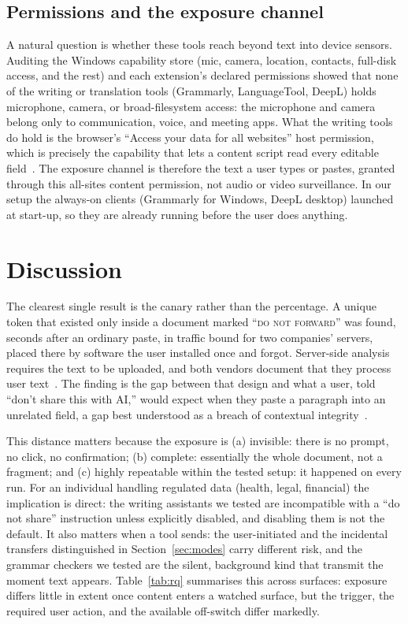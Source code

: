 \documentclass[sigconf,anonymous,review,balance=false]{acmart}
\begin{document}
\subsection{Permissions and the exposure channel}
\label{sec:permissions}

A natural question is whether these tools reach beyond text into device sensors. Auditing
the Windows capability store (mic, camera, location, contacts, full-disk access, and the
rest) and each extension's declared permissions showed that none of the writing or
translation tools (Grammarly, LanguageTool, DeepL) holds microphone, camera, or
broad-filesystem access: the microphone and camera belong only to communication, voice,
and meeting apps. What the writing tools do hold is the browser's ``Access your data for all
websites'' host permission, which is precisely the capability
that lets a content script read every editable field~\citep{mozilla2024permissions}. The
exposure channel is therefore the text a user types or pastes, granted through this
all-sites content permission, not audio or video surveillance. In our setup the always-on
clients (Grammarly for Windows, DeepL desktop) launched at start-up, so they are already
running before the user does anything.

\section{Discussion}
\label{sec:discussion}

The clearest single result is the canary rather than the percentage. A unique
token that existed only inside a document marked ``\textsc{do not forward}'' was found,
seconds after an ordinary paste, in traffic bound for two companies' servers, placed
there by software the user installed once and forgot. Server-side analysis requires the
text to be uploaded, and both vendors
document that they process user text~\citep{grammarly2025privacy,languagetool2025privacy}.
The finding is the gap between that design and what a user, told ``don't share this with
AI,'' would expect when they paste a paragraph into an unrelated field, a gap best
understood as a breach of contextual integrity~\citep{nissenbaum2004contextual}.

This distance matters because the exposure is (a) invisible: there is no prompt, no
click, no confirmation; (b) complete: essentially the whole document, not a
fragment; and (c) highly repeatable within the tested setup: it happened on every run. For
an individual handling regulated data (health, legal, financial) the implication is direct:
the writing assistants we tested are incompatible with a ``do not share''
instruction unless explicitly disabled, and disabling them is not the default. It also
matters when a tool sends: the user-initiated and the incidental transfers
distinguished in Section~\ref{sec:modes} carry different risk, and the grammar
checkers we tested are the silent, background kind that transmit the moment text appears.
Table~\ref{tab:rq} summarises this across surfaces: exposure differs little in extent once
content enters a watched surface, but the trigger, the required user action, and the
available off-switch differ markedly.
\end{document}
